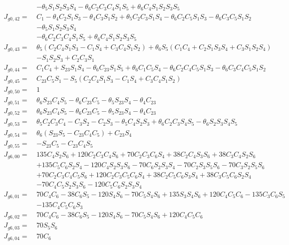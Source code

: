\documentclass[12pt]{article}
\begin{document}
\begin{CJK}{UTF8}{bsmi}
\begin{equation*}
\begin{split}
		 	  &- \theta _5S_1S_2S_3S_4 - \theta _6C_2C_3C_4S_1S_5 + \theta _6C_4S_1S_2S_3S_5\\
J_{g0,42} =\  &C_1 - \theta _4C_2S_1S_3 - \theta _4C_3S_1S_2 + \theta _5C_2C_3S_1S_4 - \theta _6C_2C_5S_1S_3 - \theta _6C_3C_5S_1S_2\\
			  & - \theta _5S_1S_2S_3S_4\\
		 	  &- \theta _6C_2C_3C_4S_1S_5 + \theta _6C_4S_1S_2S_3S_5\\
J_{g0,43} =\  &\theta _5(C_2C_4S_1S_3 - C_1S_4 + C_3C_4S_1S_2) + \theta _6S_5(C_1C_4 + C_2S_1S_3S_4 + C_3S_1S_2S_4)\\
		 	  &- S_1S_2S_3 + C_2C_3S_1\\
J_{g0,44} =\  &C_1C_4 + S_{23}S_1S_4 - \theta _6C_{23}S_1S_5 + \theta _6C_1C_5S_4 - \theta _6C_2C_4C_5S_1S_3 - \theta _6C_3C_4C_5S_1S_2\\
J_{g0,45} =\  &C_{23}C_5S_1 - S_5(C_2C_4S_1S_3 - C_1S_4 + C_3C_4S_1S_2)\\
J_{g0,50} =\  &1\\
J_{g0,51} =\  &\theta _6S_{23}C_4S_5 - \theta _6C_{23}C_5 - \theta _5S_{23}S_4 - \theta _4C_{23}\\
J_{g0,52} =\  &\theta _6S_{23}C_4S_5 - \theta _6C_{23}C_5 - \theta _5S_{23}S_4 - \theta _4C_{23}\\
J_{g0,53} =\  &\theta _5C_2C_3C_4 - C_3S_2 - C_2S_3 - \theta _5C_4S_2S_3 + \theta _6C_2C_3S_4S_5 - \theta _6S_2S_3S_4S_5\\
J_{g0,54} =\  &\theta _6(S_{23}S_5 - C_{23}C_4C_5) + C_{23}S_4\\
J_{g0,55} =\  &- S_{23}C_5 - C_{23}C_4S_5\\
J_{g6,00} =\  &135C_4S_2S_6 + 120C_2C_3C_4S_6 + 70C_2C_3C_6S_4 + 38C_2C_4S_3S_6 + 38C_3C_4S_2S_6\\
			  &+ 135C_5C_6S_2S_4 - 120C_4S_2S_3S_6 - 70C_6S_2S_3S_4 - 70C_2S_3S_5S_6 - 70C_3S_2S_5S_6\\
			  &+ 70C_2C_3C_4C_5S_6 + 120C_2C_3C_5C_6S_4 + 38C_2C_5C_6S_3S_4 + 38C_3C_5C_6S_2S_4\\
			  &- 70C_4C_5S_2S_3S_6 - 120C_5C_6S_2S_3S_4\\
J_{g6,01} =\  &70C_4C_6 - 38C_6S_5 - 120S_4S_6 - 70C_5S_4S_6 + 135S_3S_4S_6 + 120C_4C_5C_6 - 135C_3C_6S_5\\
			  &- 135C_4C_5C_6S_3\\   
J_{g6,02} =\  &70C_4C_6 - 38C_6S_5 - 120S_4S_6 - 70C_5S_4S_6 + 120C_4C_5C_6\\
J_{g6,03} =\  &70S_5S_6\\
J_{g6,04} =\  &70C_6\\

\end{split}
\end{equation*}
\end{CJK}
\end{document}
